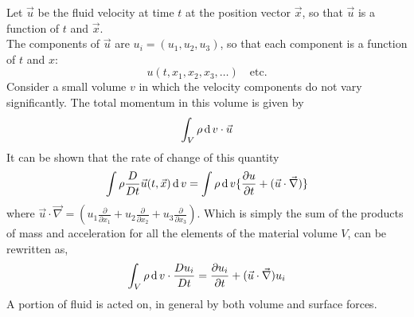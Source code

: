 \documentclass[../main-sheet.tex]{subfiles}
\begin{document}
\begin{soln}
    Let \(\vec{u}\) be the fluid velocity at time \(t\) at the position vector \(\vec{x}\), so that \(\vec{u}\) is a function of \(t\) and \(\vec{x}\).\\
    The components of \(\vec{u}\) are \(u_i=(u_1,u_2,u_3)\), so that each component is a function of \(t\) and \(x\):
    \[u(t,x_1,x_2,x_3,\dots)\quad\text{etc.}\]
    Consider a small volume \(v\) in which the velocity components do not vary significantly. The total momentum in this volume is given by
    \begin{equation}
        \int_V \rho \,\mathrm{d}\, v\cdot\vec{u}
        \label{eq:navTensor11}
    \end{equation}
    It can be shown that the rate of change of this quantity 
    \[\int \rho \frac{D}{D t}\vec{u}(t,\vec{x})\,\mathrm{d}\, v=\int \rho \,\mathrm{d}\, v \{\frac{\partial u}{\partial t}+(\vec{u}\cdot \vec{\nabla})\}\]
    where \(\vec{u}\cdot\vec{\nabla}=(u_1\frac{\partial}{\partial x_1}+u_2\frac{\partial}{\partial x_2}+u_3\frac{\partial}{\partial x_3})\). Which is simply the sum of the products of mass and acceleration for all the elements of the material volume \(V\), can be rewritten as,
    \[\int_V \rho \,\mathrm{d}\, v\cdot\frac{D u_i}{D t}=\frac{\partial u_i}{\partial t}+(\vec{u}\cdot\vec{\nabla})u_i\]
    A portion of fluid is acted on, in general by both volume and surface forces.


\end{soln}
\end{document}
